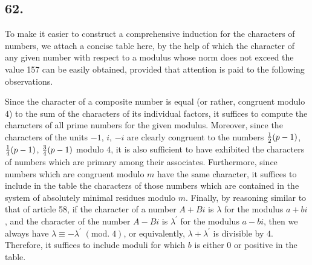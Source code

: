\documentclass[twoside,12pt]{memoir}
\renewcommand{\pmod}[1]{\;(\textrm{mod.}\;#1)}
\let\oldfrac\frac
\def\frac#1#2{\mathchoice{\tfrac{#1}{#2}}{\oldfrac{#1}{#2}}{\genfrac{}{}{}{2}{#1}{#2\mathstrut}}{\genfrac{}{}{}{3}{#1}{#2\mathstrut}}}
\begin{document}
\subsection*{62.}
 
To make it easier to construct a comprehensive induction for the characters of numbers, we attach a concise table here, by the help of which the character of any given number with respect to a modulus whose norm does not exceed the value 157 can be easily obtained, provided that attention is paid to the following observations.\pagebreak%
 
Since the character of a composite number is equal (or rather, congruent modulo \(4\)) to the sum of the characters of its individual factors, it suffices to compute the characters of all prime numbers for the given modulus. Moreover, since the characters of the units \(-1\), \(i\), \(-i\) are clearly congruent to the numbers \(\frac{1}{2}(p-1)\), \(\frac{1}{4}(p-1)\), \(\frac{3}{4}(p-1)\) modulo \(4\), it is also sufficient to have exhibited the characters of numbers which are primary among their associates. Furthermore, since numbers which are congruent modulo \(m\) have the same character, it suffices to include in the table the characters of those numbers which are contained in the system of absolutely minimal residues modulo \(m\). Finally, by reasoning similar to that of article 58, if the character of a number \(A+B i\) is \(\lambda\) for the modulus \(a+b i\), and the character of the number \(A-B i\) is \(\lambda^{\prime}\) for the modulus \(a-b i\), then we always have \(\lambda \equiv-\lambda^{\prime}\pmod{4}\), or equivalently, \(\lambda+\lambda^{\prime}\) is divisible by \(4\). Therefore, it suffices to include moduli for which \(b\) is either \(0\) or positive in the table.
\end{document}
